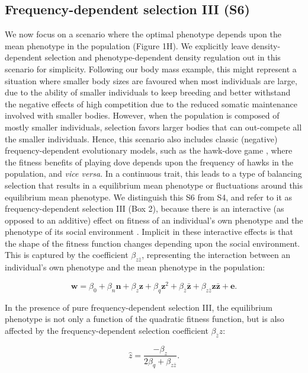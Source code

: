 \documentclass{article}
\begin{document}
 
\subsection{Frequency-dependent selection III (S6)}
We now focus on a scenario where the optimal phenotype depends upon the mean phenotype in the population (Figure 1H). We explicitly leave density-dependent selection and phenotype-dependent density regulation out in this scenario for simplicity. Following our body mass example, this might represent a situation where smaller body sizes are favoured when most individuals are large, due to the ability of smaller individuals to keep breeding and better withstand the negative effects of high competition due to the reduced somatic maintenance involved with smaller bodies. However, when the population is composed of mostly smaller individuals, selection favors larger bodies that can out-compete all the smaller individuals. Hence, this scenario also includes classic (negative) frequency-dependent evolutionary models, such as the hawk-dove game \citep{MaynardSmith1982}, where the fitness benefits of playing dove depends upon the frequency of hawks in the population, and \textit{vice versa}. In a continuous trait, this leads to a type of balancing selection that results in a equilibrium mean phenotype or fluctuations around this equilibrium mean phenotype. We distinguish this S6 from S4, and refer to it as frequency-dependent selection III (Box 2), because there is an interactive (as opposed to an additive) effect on fitness of an individual's own phenotype and the phenotype of its social environment \citep{Araya-Ajoy2020}. Implicit in these interactive effects is that the shape of the fitness function changes depending upon the social environment. This is captured by the coefficient $\beta_{z\bar{z}}$, representing the interaction between an individual's own phenotype and the mean phenotype in the population:  

\begin{equation} \label{eq: FDS}
\bm{w}=\beta_{0} +\beta_{n} \bm{n} + \beta_{z} \bm{z} + \beta_{q} \bm{z}^2 +   \beta_{\bar{z}} \bm{\bar{z}}  + \beta_{z\bar{z}} \bm{z\bar{z}}  +  \bm{e}.
\end{equation}

\noindent In the presence of pure frequency-dependent selection III, the equilibrium phenotype is not only a function of the quadratic fitness function, but is also affected by the frequency-dependent selection coefficient $\beta_{\bar{z}}z$:

\begin{equation} 
\hat{z}=\frac{-\beta_{z}}{2\beta_{q} + \beta_{z\bar{z}}}.
\end{equation} 
\end{document}
